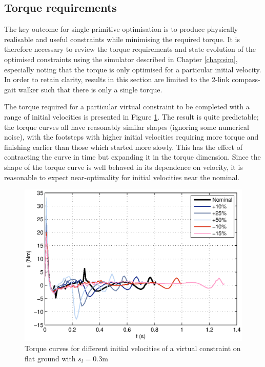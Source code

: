 \subsection{Torque requirements}
The key outcome for single primitive optimisation is to produce physically realisable and useful constraints while minimising the required torque. It is therefore necessary to review the torque requirements and state evolution of the optimised constraints using the simulator described in Chapter \ref{chap:sim}, especially noting that the torque is only optimised for a particular initial velocity. In order to retain clarity, results in this section are limited to the 2-link compass-gait walker such that there is only a single torque.

The torque required for a particular virtual constraint to be completed with a range of initial velocities is presented in Figure \ref{fig:singleflattorque}. The result is quite predictable; the torque curves all have reasonably similar shapes (ignoring some numerical noise), with the footsteps with higher initial velocities requiring more torque and finishing earlier than those which started more slowly. This has the effect of contracting the curve in time but expanding it in the torque dimension. Since the shape of the torque curve is well behaved in its dependence on velocity, it is reasonable to expect near-optimality for initial velocities near the nominal.

\begin{figure}
\centering
\includegraphics[width=0.8\linewidth]{7Results/singleflattorque}
\caption[Torque curves for differing initial velocities on flat ground]{Torque curves for different initial velocities of a virtual constraint on flat ground with $s_l=0.3$m}
\label{fig:singleflattorque}
\end{figure}

